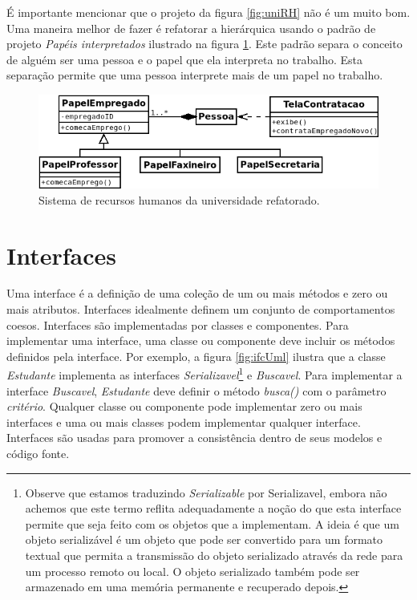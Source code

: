 \documentclass[
	11pt,				%
	openright,
	twoside,			%
	a4paper,			%
	english,			%
	french,
	brazil,				%
	sumario=tradicional
	]{abntex2}
\begin{document}
É importante mencionar que o projeto da figura \ref{fig:uniRH} não é um muito bom. Uma maneira melhor de fazer é refatorar a hierárquica usando o padrão de projeto \emph{Papéis interpretados} ilustrado na figura \ref{fig:uniRH2}. Este padrão separa o conceito de alguém ser uma pessoa e o papel que ela interpreta no trabalho. Esta separação permite que uma pessoa interprete mais de um papel no trabalho.

\begin{figure}
\begin{center}
\includegraphics[scale=0.65]{uniRH2.png}
\end{center}
\caption{Sistema de recursos humanos da universidade refatorado.} \label{fig:uniRH2}
\end{figure}

\section{Interfaces}

Uma interface é a definição de uma coleção de um ou mais métodos e zero ou mais atributos. Interfaces idealmente definem um conjunto de comportamentos coesos. Interfaces são implementadas por classes e componentes. Para implementar uma interface, uma classe ou componente deve incluir os métodos definidos pela interface. Por exemplo, a figura \ref{fig:ifcUml} ilustra que a classe \emph{Estudante} implementa as interfaces \emph{Serializavel}\footnote{Observe que estamos traduzindo \emph{Serializable} por Serializavel, embora não achemos que este termo reflita adequadamente a noção do que esta interface permite que seja feito com os objetos que a implementam. A ideia é que um objeto serializável é um objeto que pode ser convertido para um formato textual que permita a  transmissão do objeto serializado através da rede para um processo remoto ou local. O objeto serializado também pode ser armazenado em uma memória permanente e recuperado depois.} e \emph{Buscavel}. Para implementar a interface \emph{Buscavel}, \emph{Estudante} deve definir o método \emph{busca()} com o parâmetro \emph{critério}. Qualquer classe ou componente pode implementar zero ou mais interfaces e uma ou mais classes podem implementar qualquer interface. Interfaces são usadas para promover a consistência dentro de seus modelos e código fonte.
\end{document}
